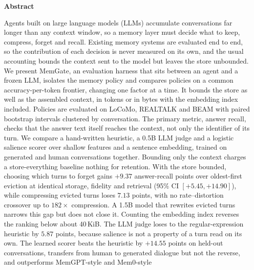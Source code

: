 \documentclass[11pt,a4paper]{article}
\begin{document}
{\renewcommand{\thefootnote}{}}
{\renewcommand{\thefootnote}{}}
\vspace{1em}
\begin{center}\small\textbf{Abstract}\end{center}
\vspace{-0.6em}
{\small\leftskip=8mm \rightskip=8mm \noindent
Agents built on large language models (LLMs) accumulate
conversations far longer than any context window, so a memory layer must
decide what to keep, compress, forget and recall. Existing memory systems are
evaluated end to end, so the contribution of each decision is never measured
on its own, and the usual accounting bounds the context sent to the model but
leaves the store unbounded.
We present MemGate, an evaluation harness that sits between an agent
and a frozen LLM, isolates the memory policy and compares policies on a common
accuracy-per-token frontier, changing one factor at a time. It bounds the
store as well as the assembled context, in tokens or in bytes with the
embedding index included. Policies are evaluated on LoCoMo, REALTALK and BEAM
with paired bootstrap intervals clustered by conversation. The primary metric,
answer recall, checks that the answer text itself reaches the context, not
only the identifier of its turn. We compare a hand-written heuristic, a 0.5B
LLM judge and a logistic salience scorer over shallow features and a sentence
embedding, trained on generated and human conversations together.
Bounding only the context charges a store-everything
baseline nothing for retention. With the store bounded, choosing which turns
to forget gains $+9.37$ answer-recall points over oldest-first eviction at
identical storage, fidelity and retrieval (95\% CI $[+5.45, +14.90]$), while
compressing evicted turns loses $7.13$ points, with no rate--distortion
crossover up to $182\times$ compression. A 1.5B model that rewrites evicted
turns narrows this gap but does not close it. Counting the embedding index
reverses the ranking below about 40\,KiB. The LLM judge loses to the
regular-expression heuristic by $5.87$ points, because salience is not a
property of a turn read on its own. The learned scorer beats the heuristic by
$+14.55$ points on held-out conversations, transfers from human to generated
dialogue but not the reverse, and outperforms MemGPT-style and Mem0-style
}
\end{document}
